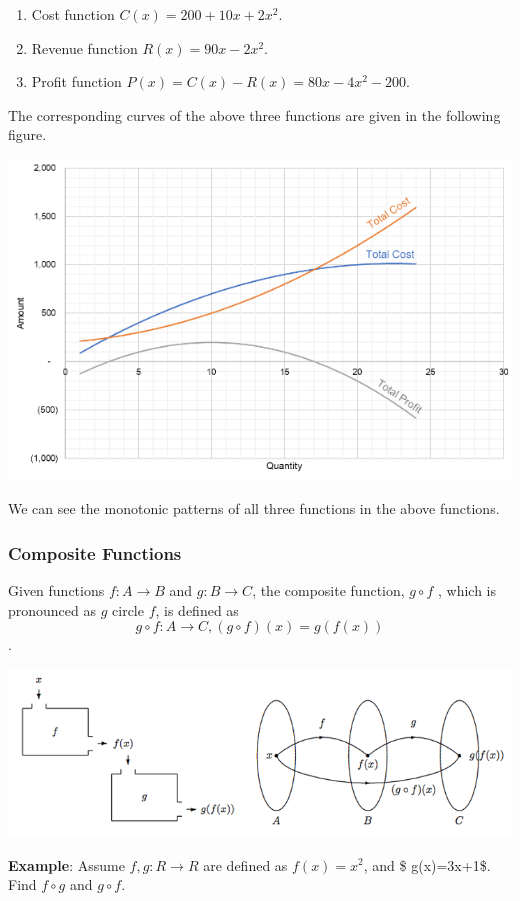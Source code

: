 \documentclass[
]{book}
\begin{document}
\begin{enumerate}
\def\labelenumi{\arabic{enumi}.}
\item
  Cost function \(C(x) = 200 + 10x +2x^2\).
\item
  Revenue function \(R(x) = 90 x -2x^2\).
\item
  Profit function \(P(x) = C(x) - R(x) = 80x - 4x^2 - 200\).
\end{enumerate}

The corresponding curves of the above three functions are given in the following figure.

\begin{center}\includegraphics[width=0.6\linewidth]{img01/w01note08-CostRevenueProfitFun} \end{center}

We can see the monotonic patterns of all three functions in the above functions.

\hypertarget{composite-functions}{%
\subsubsection{Composite Functions}\label{composite-functions}}

Given functions \(f:A\to B\) and \(g:B\to C\), the composite function, \(g\circ f\) , which is pronounced as \(g\) circle \(f\), is defined as \[g\circ f:A→C,(g\circ f)(x)=g(f(x))\].

\begin{center}\includegraphics[width=0.8\linewidth]{img01/w01note09-CompositeFun} \end{center}

\textbf{Example}: Assume \(f,g:R \to R\) are defined as \(f(x)=x^2\), and \$ g(x)=3x+1\$. Find \(f\circ g\) and \(g\circ f\).
\end{document}
